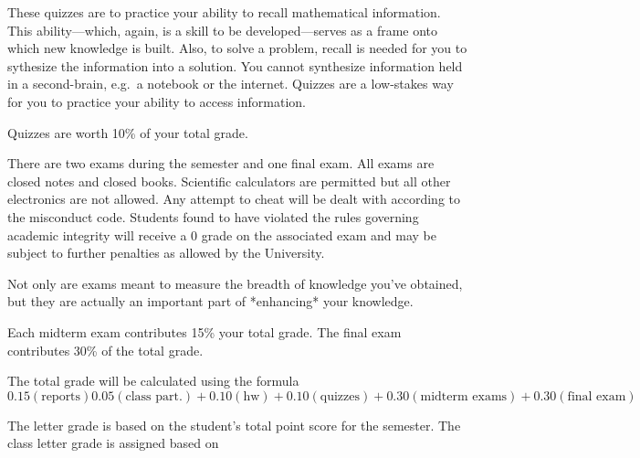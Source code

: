 \documentclass{assets/syllabus}
\begin{document}
These quizzes are to practice your ability to recall
mathematical information. This ability---which, again, is a
skill to be developed---serves as a frame onto which new
knowledge is built.  Also, to solve a problem, recall is needed
for you to sythesize the information into a solution.  You
cannot synthesize information held in a second-brain, e.g.~a
notebook or the internet. Quizzes are a low-stakes way for
you to practice your ability to access information.

Quizzes are worth 10\% of your total grade.


There are two exams during the semester and one final
exam. All exams are closed notes and closed
books. Scientific calculators are permitted but all other
electronics are not allowed. Any attempt to cheat will be
dealt with according to the misconduct code.  Students found
to have violated the rules governing academic integrity will
receive a 0 grade on the associated exam and may be subject
to further penalties as allowed by the University.

Not only are exams meant to measure the breadth of knowledge
you've obtained, but they are actually an important part of
*enhancing* your knowledge. 

Each midterm exam contributes 15\% your total grade.  The
final exam contributes 30\% of the total grade. 




The total grade will be calculated using the formula
\[
  0.15 ( \textrm{reports} )
  0.05 (\textrm{class part.}) +
  0.10 (\textrm{hw}) +
  0.10 (\textrm{quizzes}) +
  0.30 (\textrm{midterm exams}) +
  0.30 (\textrm{final exam})
\]



The letter grade is based on the student's total point score
for the semester.  The class letter grade is assigned based
on
\end{document}
